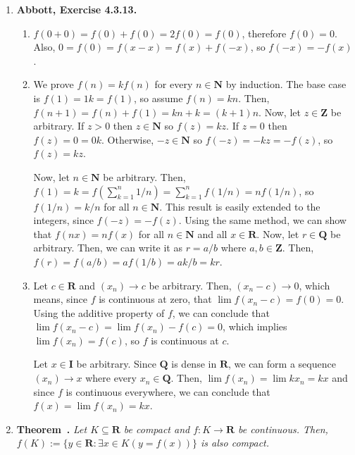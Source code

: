 \documentclass{article}
\makeatletter
\newcounter{theoremCounter}
\newenvironment{shorttheorem}{\refstepcounter{theoremCounter}
\noindent\textbf{Theorem~\thetheoremCounter.}\em}
\DeclarePairedDelimiter\abs{\lvert}{\rvert}
\let\oldabs\abs
\def\abs{\@ifstar{\oldabs}{\oldabs*}}
\newcommand{\N}{\mathbf{N}}
\newcommand{\Z}{\mathbf{Z}}
\newcommand{\Q}{\mathbf{Q}}
\newcommand{\I}{\mathbf{I}}
\newcommand{\R}{\mathbf{R}}
\newcommand{\set}[1]{\{#1\}}
\newcommand{\exc}[2][Abbott]{\item \textbf{#1, Exercise #2.}}
\makeatother
\begin{document}
\begin{enumerate}
    Let $g(x) = \abs{x-a}$ for some $a \in F$ and $x \notin F$. Then, $g(x)$ is only $0$ when $x = a$, but $x \notin F$, so $x \neq a$ and $g(x) \neq 0$.
    
    \exc{4.3.13}
    \begin{enumerate}
        \item $f(0+0) = f(0) + f(0) = 2f(0) = f(0)$, therefore $f(0) = 0$. Also, $0 = f(0) = f(x-x) = f(x) + f(-x)$, so $f(-x) = -f(x)$.
        
        \item We prove $f(n) = k f(n)$ for every $n \in \N$ by induction. The base case is $f(1) = 1 k = f(1)$, so assume $f(n) = k n$. Then, $f(n+1) = f(n) + f(1) = k n + k = (k+1) n$. Now, let $z \in \Z$ be arbitrary. If $z > 0$ then $z \in \N$ so $f(z) = k z$. If $z = 0$ then $f(z) = 0 = 0 k$. Otherwise, $-z \in \N$ so $f(-z) = -k z = -f(z)$, so $f(z) = k z$. 
        
        Now, let $n \in \N$ be arbitrary. Then, $f(1) = k = f(\sum_{k=1}^n 1/n) = \sum_{k=1}^n f(1/n) = n f(1/n)$, so $f(1/n) = k/n$ for all $n \in \N$. This result is easily extended to the integers, since $f(-z)=-f(z)$. Using the same method, we can show that $f(n x) = n f(x)$ for all $n \in \N$ and all $x \in \R$. Now, let $r \in \Q$ be arbitrary. Then, we can write it as $r = a/b$ where $a,b \in \Z$. Then, $f(r)=f(a/b)= a f(1/b) = a k /b = k r$.
        
        \item Let $c \in \R$ and $(x_n) \to c$ be arbitrary. Then, $(x_n-c) \to 0$, which means, since $f$ is continuous at zero, that $\lim f(x_n -c) = f(0) = 0$. Using the additive property of $f$, we can conclude that $\lim f(x_n-c) = \lim f(x_n) - f(c) = 0$, which implies $\lim f(x_n) = f(c)$, so $f$ is continuous at $c$.
        
        Let $x \in \I$ be arbitrary. Since $\Q$ is dense in $\R$, we can form a sequence $(x_n) \to x$ where every $x_n \in \Q$. Then, $\lim f(x_n) = \lim k x_n = k x$ and since $f$ is continuous everywhere, we can conclude that $f(x) = \lim f(x_n) = k x$.
    \end{enumerate}
    
    \item \begin{shorttheorem}
        Let $K \subseteq \R$ be compact and $f: K \to \R$ be continuous. Then, $f(K) := \set{y \in \R : \exists x \in K (y = f(x))}$ is also compact.
    \end{shorttheorem}
    

\end{enumerate}
\end{document}
